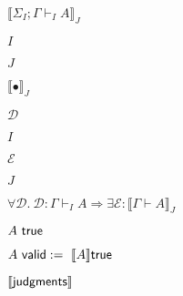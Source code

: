 \documentclass[10pt]{book}
\begin{document}
\begin{mdSnippets}
\begin{mdInlineSnippet}
$ \llbracket \Sigma_I;\Gamma\vdash_I A\rrbracket_J$\end{mdInlineSnippet}%
\begin{mdInlineSnippet}[dd7536794b63bf90eccfd37f9b147d7f]%
$I$\end{mdInlineSnippet}%
\begin{mdInlineSnippet}%
$J$\end{mdInlineSnippet}%
\begin{mdInlineSnippet}%
$\llbracket\bullet \rrbracket_J$\end{mdInlineSnippet}%
\begin{mdInlineSnippet}%
$\mathcal{D}$\end{mdInlineSnippet}%
\begin{mdInlineSnippet}[dd7536794b63bf90eccfd37f9b147d7f]%
$I$\end{mdInlineSnippet}%
\begin{mdInlineSnippet}%
$\mathcal{E}$\end{mdInlineSnippet}%
\begin{mdInlineSnippet}%
$J$\end{mdInlineSnippet}%
\begin{mdInlineSnippet}[8ee221b554f334322dd70423103cfd8b]%
$\forall \mathcal{D}. \ \mathcal{D}:\Gamma\vdash_I A \Longrightarrow \exists\mathcal{E}: \llbracket \Gamma\vdash A\rrbracket_J$\end{mdInlineSnippet}%
\begin{mdInlineSnippet}%
$A \ {\sf true}$\end{mdInlineSnippet}%
\begin{mdInlineSnippet}[9f791c2d98cbbb2d22338197dd5d3ca4]%
$A\  {\sf valid}:=\  \llbracket A \rrbracket {\sf true}$\end{mdInlineSnippet}%
\begin{mdInlineSnippet}%
$\llbracket \sf {judgments}\rrbracket$\end{mdInlineSnippet}%
\begin{mdInlineSnippet}%

\end{mdInlineSnippet}
\end{mdSnippets}
\end{document}
